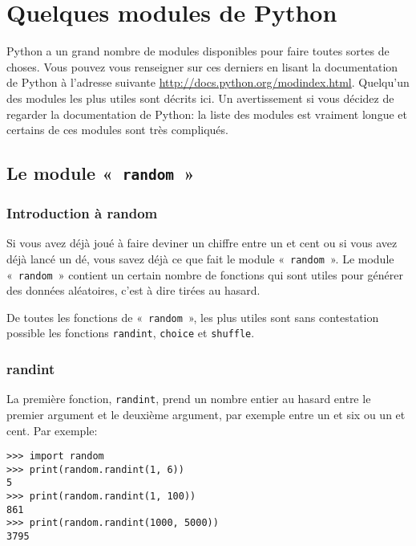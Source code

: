

\chapter{Quelques modules de Python}\label{app:modules}

Python a un grand nombre de modules disponibles pour faire toutes sortes de choses. Vous pouvez vous renseigner sur ces derniers en lisant la documentation de Python à l'adresse suivante \url{http://docs.python.org/modindex.html}. Quelqu'un des modules les plus utiles sont décrits ici. Un avertissement si vous décidez de regarder la documentation de Python: la liste des modules est vraiment longue et certains de ces modules sont très compliqués.

\section{Le module « \texttt{random} »}
\subsection{Introduction à random}
Si vous avez déjà joué à faire deviner un chiffre entre un et cent ou si vous avez déjà lancé un dé, vous savez déjà ce que fait le module « \texttt{random} ». Le module « \texttt{random} » contient un certain nombre de fonctions qui sont utiles pour générer des données aléatoires, c'est à dire tirées au hasard.

De toutes les fonctions de « \texttt{random} », les plus utiles sont sans contestation possible les fonctions \verb+randint+, \verb+choice+ et \verb+shuffle+. 

\subsection{randint}
La première fonction, \verb+randint+, prend un nombre entier au hasard entre le premier argument et le deuxième argument, par exemple entre un et six ou un et cent. Par exemple:

\begin{Verbatim}[frame=single,rulecolor=\color{gray}]
>>> import random
>>> print(random.randint(1, 6))
5
>>> print(random.randint(1, 100))
861
>>> print(random.randint(1000, 5000))
3795
\end{Verbatim}

